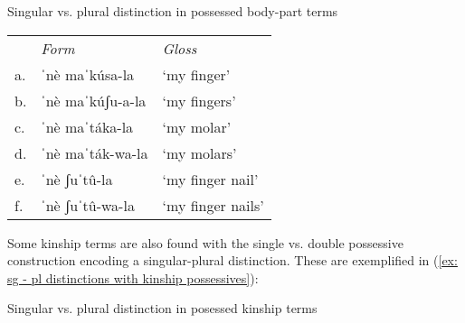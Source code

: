 \ea\label{ex: sg - pl distinctions with possessives}
{Singular vs. plural distinction in possessed body-part terms}\\

\begin{tabular}{lll}
        & \textit{Form} &  \textit{Gloss}\\
     a.& ˈnè maˈkúsa-la &  `my finger'\\
     b.& ˈnè maˈkúʃu-a-la  & `my fingers'\\
     c.& ˈnè maˈtáka-la &  `my molar' \\
     d.& ˈnè maˈták-wa-la & `my molars'\\
     e.& ˈnè ʃuˈtû-la & `my finger nail'\\
     f.& ˈnè ʃuˈtû-wa-la & `my finger nails'\\
\end{tabular}
    \z

Some kinship terms are also found with the single vs. double possessive construction encoding a singular-plural distinction. These are exemplified in (\ref{ex: sg - pl distinctions with kinship possessives}):

\ea\label{ex: sg - pl distinctions with kinship possessives}
{Singular vs. plural distinction in posessed kinship terms}

    \z
\z

